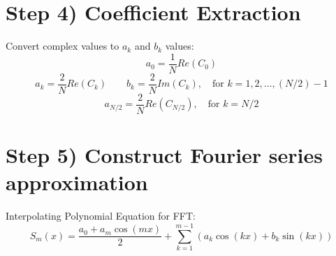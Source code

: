 \documentclass[12pt]{article}
\begin{document}
\section*{Step 4) Coefficient Extraction}
Convert complex values to $a_k$ and $b_k$ values:
\[a_0 = \frac{1}{N}Re(C_0)\]
\[a_k = \frac{2}{N}Re(C_k) \quad \quad b_k = \frac{2}{N}Im(C_k), \quad \text{for } k=1,2,\ldots,(N/2)-1\]
\[a_{N/2} = \frac{2}{N}Re(C_{N/2}), \quad \text{for } k = N/2\]

\section*{Step 5) Construct Fourier series approximation}
Interpolating Polynomial Equation for FFT:
\[S_m(x) = \frac{a_0 + a_m\cos(mx)}{2} + \sum_{k=1}^{m-1}(a_k\cos(kx) + b_k\sin(kx))\]
\end{document}
